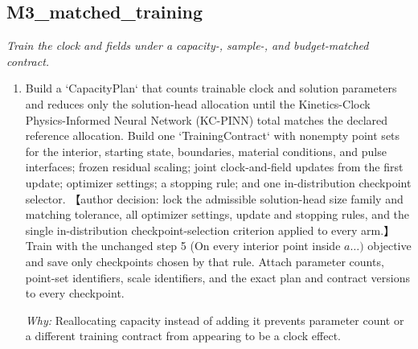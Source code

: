 \documentclass[10pt,a4paper]{article}
\begin{document}
\subsection*{M3\_matched\_training}
\emph{Train the clock and fields under a capacity-, sample-, and budget-matched contract.}
\begin{enumerate}[leftmargin=*,start=6]
  \item Build a `CapacityPlan` that counts trainable clock and solution parameters and reduces only the solution-head allocation until the Kinetics-Clock Physics-Informed Neural Network (KC-PINN) total matches the declared reference allocation. Build one `TrainingContract` with nonempty point sets for the interior, starting state, boundaries, material conditions, and pulse interfaces;\allowbreak{} frozen residual scaling;\allowbreak{} joint clock-and-field updates from the first update;\allowbreak{} optimizer settings;\allowbreak{} a stopping rule;\allowbreak{} and one in-distribution checkpoint selector. 【author decision: lock the admissible solution-head size family and matching tolerance, all optimizer settings, update and stopping rules, and the single in-distribution checkpoint-selection criterion applied to every arm.】 Train with the unchanged step 5 (On every interior point inside \(a\dots )\) objective and save only checkpoints chosen by that rule. Attach parameter counts, point-set identifiers, scale identifiers, and the exact plan and contract versions to every checkpoint.
\par\emph{Why:} Reallocating capacity instead of adding it prevents parameter count or a different training contract from appearing to be a clock effect.
\end{enumerate}
\end{document}
